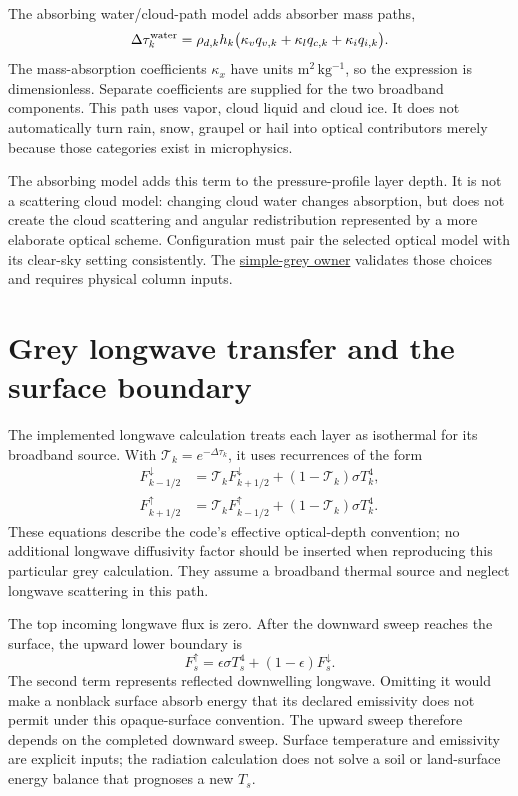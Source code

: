 The absorbing water/cloud-path model adds absorber mass paths,
\[
 \Delta\tau_k^{\rm water}
 =\rho_{d,k}h_k
   \big(\kappa_vq_{v,k}+\kappa_lq_{c,k}+\kappa_iq_{i,k}\big).
\]
The mass-absorption coefficients $\kappa_x$ have units
$\mathrm{m^2\,kg^{-1}}$, so the expression is dimensionless. Separate
coefficients are supplied for the two broadband components. This path uses
vapor, cloud liquid and cloud ice. It does not automatically turn rain, snow,
graupel or hail into optical contributors merely because those categories
exist in microphysics.

The absorbing model adds this term to the pressure-profile layer depth. It is
not a scattering cloud model: changing cloud water changes absorption, but
does not create the cloud scattering and angular redistribution represented by
a more elaborate optical scheme. Configuration must pair the selected optical
model with its clear-sky setting consistently. The
\href{../src/radiation/schemes/simple_grey/simple_grey.cpp}{simple-grey owner}
validates those choices and requires physical column inputs.

\section{Grey longwave transfer and the surface boundary}

The implemented longwave calculation treats each layer as isothermal for its
broadband source. With $\mathcal T_k=e^{-\Delta\tau_k}$, it uses recurrences
of the form
\[
 \begin{aligned}
 F^\downarrow_{k-1/2}
 &=\mathcal T_k F^\downarrow_{k+1/2}
   +(1-\mathcal T_k)\sigma T_k^4,\\
 F^\uparrow_{k+1/2}
 &=\mathcal T_k F^\uparrow_{k-1/2}
   +(1-\mathcal T_k)\sigma T_k^4.
 \end{aligned}
\]
These equations describe the code's effective optical-depth convention; no
additional longwave diffusivity factor should be inserted when reproducing this
particular grey calculation. They assume a broadband thermal source and neglect
longwave scattering in this path.

The top incoming longwave flux is zero. After the downward sweep reaches the
surface, the upward lower boundary is
\[
 F^\uparrow_s=\epsilon\sigma T_s^4
                 +(1-\epsilon)F^\downarrow_s.
\]
The second term represents reflected downwelling longwave. Omitting it would
make a nonblack surface absorb energy that its declared emissivity does not
permit under this opaque-surface convention. The upward sweep therefore depends
on the completed downward sweep. Surface temperature and emissivity are explicit
inputs; the radiation calculation does not solve a soil or land-surface energy
balance that prognoses a new $T_s$.

